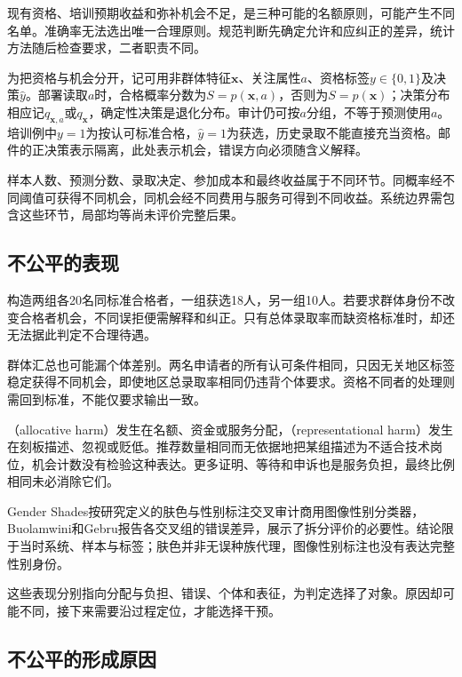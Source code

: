 现有资格、培训预期收益和弥补机会不足，是三种可能的名额原则，可能产生不同名单。准确率无法选出唯一合理原则。规范判断先确定允许和应纠正的差异，统计方法随后检查要求，二者职责不同。

为把资格与机会分开，记可用非群体特征$\bm{x}$、关注属性$a$、资格标签$y\in\{0,1\}$及决策$\hat y$。部署读取$a$时，合格概率分数为$S=p(\bm{x},a)$，否则为$S=p(\bm{x})$；决策分布相应记$q_{\bm{x},a}$或$q_{\bm{x}}$，确定性决策是退化分布。审计仍可按$a$分组，不等于预测使用$a$。培训例中$y=1$为按认可标准合格，$\hat y=1$为获选，历史录取不能直接充当资格。邮件的正决策表示隔离，此处表示机会，错误方向必须随含义解释。

样本人数、预测分数、录取决定、参加成本和最终收益属于不同环节。同概率经不同阈值可获得不同机会，同机会经不同费用与服务可得到不同收益。系统边界需包含这些环节，局部均等尚未评价完整后果。

\subsection{不公平的表现}
\label{sec:fairness-manifestations}

构造两组各20名同标准合格者，一组获选18人，另一组10人。若要求群体身份不改变合格者机会，不同误拒便需解释和纠正。只有总体录取率而缺资格标准时，却还无法据此判定不合理待遇。

群体汇总也可能漏个体差别。两名申请者的所有认可条件相同，只因无关地区标签稳定获得不同机会，即使地区总录取率相同仍违背个体要求。资格不同者的处理则需回到标准，不能仅要求输出一致。

（allocative harm）发生在名额、资金或服务分配，（representational harm）发生在刻板描述、忽视或贬低。推荐数量相同而无依据地把某组描述为不适合技术岗位，机会计数没有检验这种表达。更多证明、等待和申诉也是服务负担，最终比例相同未必消除它们。

Gender Shades按研究定义的肤色与性别标注交叉审计商用图像性别分类器，Buolamwini和Gebru报告各交叉组的错误差异，展示了拆分评价的必要性。结论限于当时系统、样本与标签；肤色并非无误种族代理，图像性别标注也没有表达完整性别身份。

这些表现分别指向分配与负担、错误、个体和表征，为判定选择了对象。原因却可能不同，接下来需要沿过程定位，才能选择干预。

\subsection{不公平的形成原因}
\label{sec:fairness-causes}

